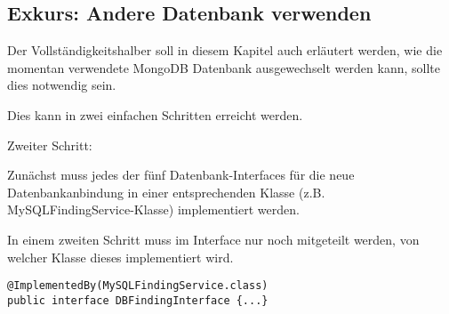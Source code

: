\subsection{Exkurs: Andere Datenbank verwenden}
Der Vollständigkeitshalber soll in diesem Kapitel auch erläutert werden, wie die momentan verwendete MongoDB Datenbank ausgewechselt werden kann, sollte dies notwendig sein.

Dies kann in zwei einfachen Schritten erreicht werden.

\begin{labeling}{Zweiter Schritt:}
	\item [Erster Schritt:] Zunächst muss jedes der fünf Datenbank-Interfaces für die neue Datenbankanbindung in einer entsprechenden Klasse (z.B. MySQL\-Finding\-Service-Klasse) implementiert werden. 
	\item [Zweiter Schritt:] In einem zweiten Schritt muss im Interface nur noch mitgeteilt werden, von welcher Klasse dieses implementiert wird.

\begin{lstlisting}[caption={Andere Datenbank verwenden}, label=changeDatabase]
@ImplementedBy(MySQLFindingService.class)
public interface DBFindingInterface {...}
\end{lstlisting}
\end{labeling}
